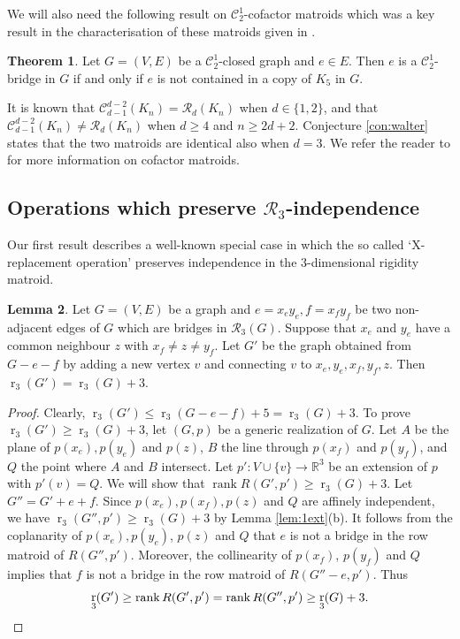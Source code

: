 \documentclass[11pt,a4paper]{article}
\theoremstyle{definition}
\newtheorem{theorem}{Theorem}[section]
\newtheorem{lemma}[theorem]{Lemma}
\DeclareMathOperator{\rr}{r}
\DeclareMathOperator{\rank}{rank}
\newcommand{\cR}{\mathcal{R}}
\newcommand{\R}{\mathbb{R}}
\newcommand{\cC}{\mathcal{C}}
\begin{document}
We will also need the following result on $\cC^1_2$-cofactor matroids which was a key result in the characterisation of these matroids given in \cite{CJT}.

\begin{theorem}\cite{CJT}\label{thm:CJT:K5}
Let $G=(V,E)$ be a $\mathcal{C}_2^1$-closed graph and $e\in E$. Then $e$ is a $\mathcal{C}_2^1$-bridge in $G$ if and only if $e$ is not contained in a copy of $K_5$ in $G$.
\end{theorem}

It is known that $\cC^{d-2}_{d-1}(K_n)=\cR_{d}(K_n)$ when $d\in \{1,2\}$, and that 
$\cC^{d-2}_{d-1}(K_n)\neq \cR_{d}(K_n)$ when $d\geq 4$ and $n\geq 2d+2$. Conjecture \ref{con:walter} states that the two matroids are identical also when $d=3$. We refer the reader to \cite{Wlong} for more information on cofactor matroids.


\subsection{Operations which preserve $\mathcal{R}_3$-independence}
\label{sec:operations}




Our first result describes a well-known special case in which the so called `X-replacement operation' preserves independence in the 3-dimensional rigidity matroid. 

\begin{lemma}\label{lem:coplanar}
Let $G=(V,E)$ be a graph and $e=x_ey_e,f=x_fy_f$ be two non-adjacent edges of $G$ which are bridges in $\mathcal{R}_3(G)$. Suppose that $x_e$ and $y_e$ have a common neighbour $z$ with $x_f\neq z\neq y_f$. Let $G'$ be the graph obtained from $G-e-f$ by adding a new vertex $v$ and connecting $v$ to $x_e,y_e,x_f,y_f, z$.
Then $\rr_3(G')=\rr_3(G)+3$.
\end{lemma}
\begin{proof}
Clearly, $\rr_3(G')\leq \rr_3(G-e-f)+5= \rr_3(G)+3$. To prove $\rr_3(G')\geq \rr_3(G)+3$, let $(G,p)$ be a generic realization of $G$. Let $A$ be the plane of $p(x_e),p(y_e)$ and $p(z)$, $B$ the line through $p(x_f)$ and $p(y_f)$, and $Q$ the point where $A$ and $B$ intersect. Let $p':V\cup \{v\}\to \R^3$ be an extension of $p$ with $p'(v)=Q$.  We will show that $\rank R(G',p')\geq \rr_3(G)+3$. Let $G''=G'+e+f$. Since $p(x_e),p(x_f),p(z)$ and $Q$ are affinely independent, we have $\rr_3(G'', p')\geq \rr_3(G)+3$ by Lemma \ref{lem:1ext}(b).
It follows from the coplanarity of $p(x_e),p(y_e)$, $p(z)$ and $Q$ that $e$ is not a bridge  in the row matroid of $R(G'', p')$. Moreover, the collinearity of $p(x_f)$, $p(y_f)$ and $Q$ implies that $f$ 
is not a bridge 
in the row matroid of $R(G''-e, p')$. Thus  \begin{equation*}
\rr_3(G')\geq \rank R(G',p')= \rank R(G'',p') \geq \rr_3(G)+3.
\qedhere
\end{equation*}
\end{proof}
\end{document}
